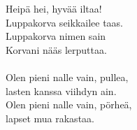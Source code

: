 
        Heipä hei, hyvää iltaa! \\
        Luppakorva seikkailee taas. \\
        Luppakorva nimen sain \\
        Korvani nääs lerputtaa. \\
\hspace{10mm} \\
        Olen pieni nalle vain, pullea, \\
        lasten kanssa viihdyn ain. \\
        Olen pieni nalle vain, pörheä, \\
        lapset mua rakastaa. \\
